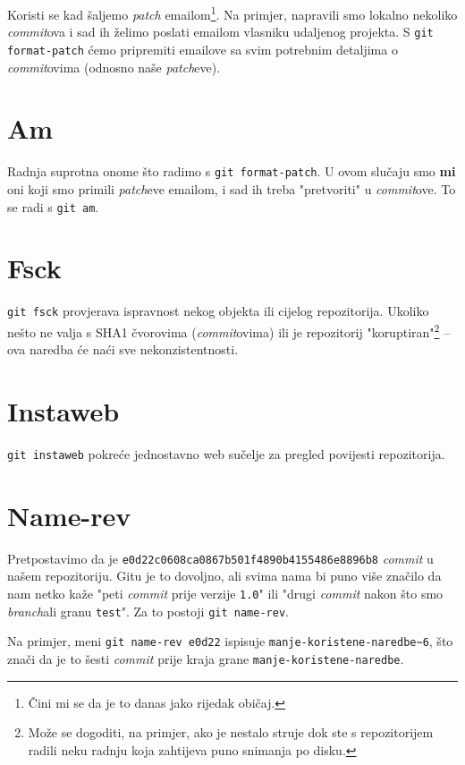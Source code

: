 Koristi se kad šaljemo \emph{patch} emailom\footnote{Čini mi se da je to danas jako rijedak običaj.}.
Na primjer, napravili smo lokalno nekoliko \emph{commit}ova i sad ih želimo poslati emailom vlasniku udaljenog projekta.
S \verb+git format-patch+ ćemo pripremiti emailove sa svim potrebnim detaljima o \emph{commit}ovima (odnosno naše \emph{patch}eve).

\section*{Am}

Radnja suprotna onome što radimo s \verb+git format-patch+.
U ovom slučaju smo \textbf{mi} oni koji smo primili \emph{patch}eve emailom, i sad ih treba "pretvoriti" u \emph{commit}ove.
To se radi s \verb+git am+.

\section*{Fsck}

\verb+git fsck+ provjerava ispravnost nekog objekta ili cijelog repozitorija.
Ukoliko nešto ne valja s SHA1 čvorovima (\emph{commit}ovima) ili je repozitorij "koruptiran"\footnote{Može se dogoditi, na primjer, ako je nestalo struje dok ste s repozitorijem radili neku radnju koja zahtijeva puno snimanja po disku.} -- ova naredba će naći sve nekonzistentnosti.

\section*{Instaweb}

\verb+git instaweb+ pokreće jednostavno web sučelje za pregled povijesti repozitorija.

\section*{Name-rev}

Pretpostavimo da je \verb+e0d22c0608ca0867b501f4890b4155486e8896b8+ \emph{commit} u našem repozitoriju.
Gitu je to dovoljno, ali svima nama bi puno više značilo da nam netko kaže "peti \emph{commit} prije verzije \verb+1.0+" ili "drugi \emph{commit} nakon što smo \emph{branch}ali granu \verb+test+".
Za to postoji \verb+git name-rev+.

Na primjer, meni \verb+git name-rev e0d22+ ispisuje \verb+manje-koristene-naredbe~6+, što znači da je to šesti \emph{commit} prije kraja grane \verb+manje-koristene-naredbe+.

